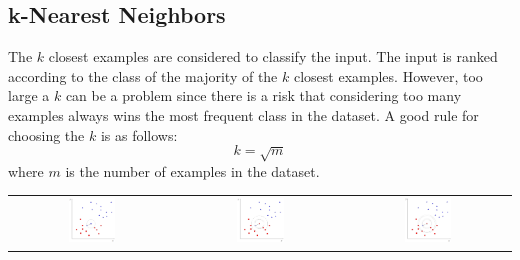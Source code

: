 \subsection{k-Nearest Neighbors}
The $k$ closest examples are considered to classify the input.
The input is ranked according to the class of the majority of the $k$ closest examples.
However, too large a $k$ can be a problem since there is a risk that considering too many examples always wins the most frequent class in the dataset.
A good rule for choosing the $k$ is as follows:
\begin{equation} \tag*{}
    k = \sqrt{m}
\end{equation}
where $m$ is the number of examples in the dataset.
\begin{center}
    \begin{tabular}{c c c}
        \\
        \includegraphics[width=0.3\textwidth]{images/kNN2.png} &
        \includegraphics[width=0.3\textwidth]{images/kNN3.png} &
        \includegraphics[width=0.3\textwidth]{images/kNN4.png}
    \end{tabular} 
\end{center}

\newpage
